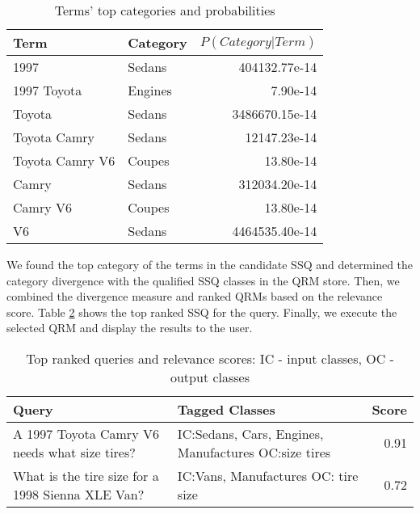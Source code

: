 \begin{table}[h]\footnotesize

\begin{tabular}{| p{3.2cm} | l | r |}
\hline 
Term & Category & $P(Category|Term)$ \\ \hline
1997 & Sedans & 404132.77e-14\\ 
1997 Toyota & Engines & 7.90e-14\\ 
Toyota  & Sedans & 3486670.15e-14\\ 
Toyota Camry & Sedans & 12147.23e-14\\ 
Toyota Camry V6 & Coupes & 13.80e-14\\ 
Camry & Sedans & 312034.20e-14\\ 
Camry V6 & Coupes & 13.80e-14\\ 
V6 & Sedans & 4464535.40e-14\\ \hline
\end{tabular}        

\caption{Terms' top categories and probabilities}
\label{tbl:term_categories}   

\end{table}

We found the top category of the terms in the candidate SSQ and determined the category divergence with the qualified SSQ classes in the QRM store. Then, we combined the divergence measure and
ranked QRMs based on the relevance score. Table \ref{tbl:ranked_queries} shows the top ranked SSQ for the query.  Finally, we execute the selected QRM and display the results to the user.

\begin{table}[h]\footnotesize

\begin{tabular}{| p{3.5cm} | p{3cm} | r |}
\hline
Query & Tagged Classes & Score\\ \hline
A 1997 Toyota Camry V6 needs what size tires? & IC:Sedans, Cars, Engines, Manufactures OC:size tires & 0.91\\ \hline 
What is the tire size for a 1998 Sienna XLE Van? & IC:Vans, Manufactures OC: tire size & 0.72\\ \hline 
\end{tabular}

\caption{Top ranked queries and relevance scores: IC - input classes, OC - output classes}
\label{tbl:ranked_queries}   

\end{table}


